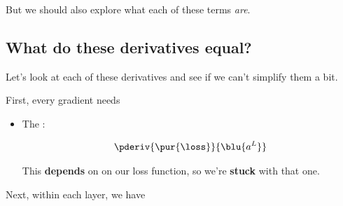         But we should also explore what each of these terms \textit{are}.
        
    \phantom{}
    
    \subsection{What do these derivatives equal?}
    
        Let's look at each of these derivatives and see if we can't simplify them a bit.
        
        First, every gradient needs
        
        \begin{itemize}
            \item The :
            
                \begin{equation}
                    \pderiv {\pur{\loss}} {\blu{a^L}}
                \end{equation}
                
                This \textbf{depends} on on our loss function, so we're \textbf{stuck} with that one.
            
        \end{itemize}
            
        Next, within each layer, we have
        
